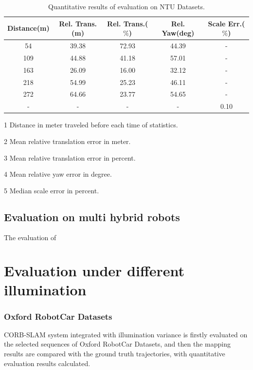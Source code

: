\begin{table}
	\centering
	\caption{Quantitative results of evaluation on NTU Datasets.}
	\begin{threeparttable}
		\begin{tabular}{|c|c|c|c|c|}
			\hline
			Distance(m)\tnote{1} & Rel. Trans.(m)\tnote{2}  & Rel. Trans.($\%$)\tnote{3} & Rel. Yaw(deg)\tnote{4} & Scale Err.($\%$)\tnote{5}  \\
			\hline
			54& 39.38 & 72.93 & 44.39& - \\
			\hline
			109&44.88& 41.18 & 57.01 & - \\
			\hline
			163&26.09& 16.00 & 32.12 & - \\
			\hline
			218&54.99& 25.23 & 46.11 & - \\
			\hline
			272&64.66& 23.77 & 54.65 & - \\
			\hline
			-&-&- & - &  0.10\\
			\hline
		\end{tabular}
		\begin{tablenotes}
			\footnotesize
			\item[1] Distance in meter traveled before each time of statistics. 
			\item[2] Mean relative translation error in meter.
			\item[3] Mean relative translation error in percent.
			\item[4] Mean relative yaw error in degree.
			\item[5] Median scale error in percent.
		\end{tablenotes}
	\end{threeparttable}
	\label{tbl:ntuquanresult}
\end{table}

\subsection{Evaluation on multi hybrid robots}
The evaluation of 

\section{Evaluation under different illumination}
\subsubsection{Oxford RobotCar Datasets}
CORB-SLAM system integrated with illumination variance is firstly evaluated on the selected sequences of Oxford RobotCar Datasets, and then the mapping results are compared with the ground truth trajectories, with quantitative evaluation results calculated.

